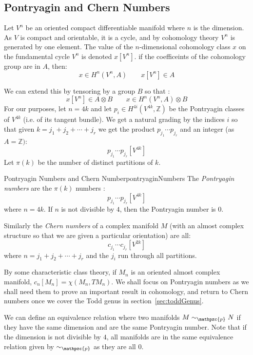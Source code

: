 \documentclass{book}
\newcommand{\Z}{{\mathbb{Z}}}
\newcommand{\cp}{{\mathpzc{p}}}
\newcommand{\qn}{\quad\newline}
\begin{document}
\subsection{Pontryagin and Chern Numbers}\label{sec:pontryaginNum}

Let $V^n$ be an oriented compact differentiable manifold where $n$ is the dimension. As $V$ is compact and
orientable, it is a cycle, and by cohomology theory $V^n$ is generated by one element. The value of the
$n$-dimensional cohomology class $x$ on the fundamental cycle $V^n$ is denoted $x[V^n]$.  if the coefficeints
of the cohomology group are in $A$, then:
\[
  x \in H^n(V^n, A) \qquad x[V^n] \in A
\]

We can extend this by tensoring by a group $B$ so that :
\[
  x[V^n] \in A\otimes B \qquad x \in H^n(V^n, A)\otimes B
\]
For our purposes, let $n = 4k$ and let $p_i \in H^{4i}(V^{4k}, \Z)$ be the Pontryagin classes of $V^{4k}$
(i.e. of its tangent bundle). We
get a natural grading by the indices $i$ so that given $k = j_1 + j_2 + \cdots + j_r$ we get the product
$p_{j_1}\cdots p_{j_r}$ and an integer (as $A = \Z)$:
\[
  p_{j_1}\cdots p_{j_r}[V^{4k}]
\]
Let $\pi(k)$ be the number of distinct partitions of $k$.

\begin{defn}{Pontryagin Numbers and Chern Number}{pontryaginNumbers}
  The \emph{Pontryagin numbers} are the $\pi(k)$ numbers :
  \[
    p_{j_1}\cdots p_{j_r}[V^{4k}]
  \]
  where $n = 4k$. If $n$ is not divisible by $4$, then the Pontryagin number is $0$.

  \qn
  Similarly the \emph{Chern numbers} of a complex manifold $M$ (with an almost complex structure so that we
  are given a particular orientation) are all:
  \[
    c_{j_1}\cdots c_{j_r}[V^{2k}]
  \]
  where $n = j_1 + j_2 + \cdots + j_r$ and the $j_i$ run through all partitions.
\end{defn}

By some characteristic class theory, if $M_n$ is an oriented almost complex manifold, $c_n[M_n] = \chi(M_n,
TM_n)$. We shall focus on Pontryagin numbers as we shall need them to prove an important result in cohomology,
and return to Chern numbers once we cover the Todd genus in section~\ref{sec:toddGenus}.

We can define an equivalence relation where two manifolds $M\sim_\cp N$ if they have the same dimension and
are the same Pontryagin number. Note that if the dimension is not divisible by $4$, all manifolds are in the
same equivalence relation given by $\sim_\cp$ as they are all $0$.
\end{document}
